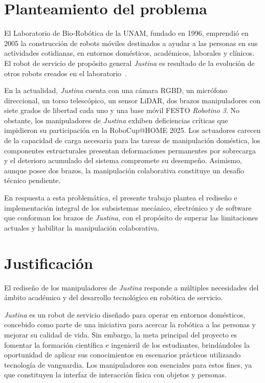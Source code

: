 \section{Planteamiento del problema}

El Laboratorio de Bio-Robótica de la UNAM, fundado en 1996, emprendió en 2005 la construcción de robots móviles destinados a ayudar a las personas en sus actividades cotidianas, en entornos domésticos, académicos, laborales y clínicos. El robot de servicio de propósito general \emph{Justina} es resultado de la evolución de otros robots creados en el laboratorio~\cite{justina_uv}.

En la actualidad, \emph{Justina} cuenta con una cámara RGBD, un micrófono direccional, un torso telescópico, un sensor LiDAR, dos brazos manipuladores con siete grados de libertad cada uno y una base móvil FESTO \emph{Robotino 3}. No obstante, los manipuladores de \emph{Justina} exhiben deficiencias críticas que impidieron su participación en la RoboCup@HOME 2025. Los actuadores carecen de la capacidad de carga necesaria para las tareas de manipulación doméstica, los componentes estructurales presentan deformaciones permanentes por sobrecarga y el deterioro acumulado del sistema compromete su desempeño. Asimismo, aunque posee dos brazos, la manipulación colaborativa constituye un desafío técnico pendiente.

En respuesta a esta problemática, el presente trabajo plantea el rediseño e implementación integral de los subsistemas mecánico, electrónico y de software que conforman los brazos de \emph{Justina}, con el propósito de superar las limitaciones actuales y habilitar la manipulación colaborativa.

\section{Justificaci\'on}

El rediseño de los manipuladores de \emph{Justina} responde a múltiples necesidades del ámbito académico y del desarrollo tecnológico en robótica de servicio.

\emph{Justina} es un robot de servicio diseñado para operar en entornos domésticos, concebido como parte de una iniciativa para acercar la robótica a las personas y mejorar su calidad de vida. Sin embargo, la meta principal del proyecto es fomentar la formación científica e ingenieril de los estudiantes, brindándoles la oportunidad de aplicar sus conocimientos en escenarios prácticos utilizando tecnología de vanguardia\cite{BioRoboticsUNAM}. Los manipuladores son esenciales para estos fines, ya que constituyen la interfaz de interacción física con objetos y personas.  

